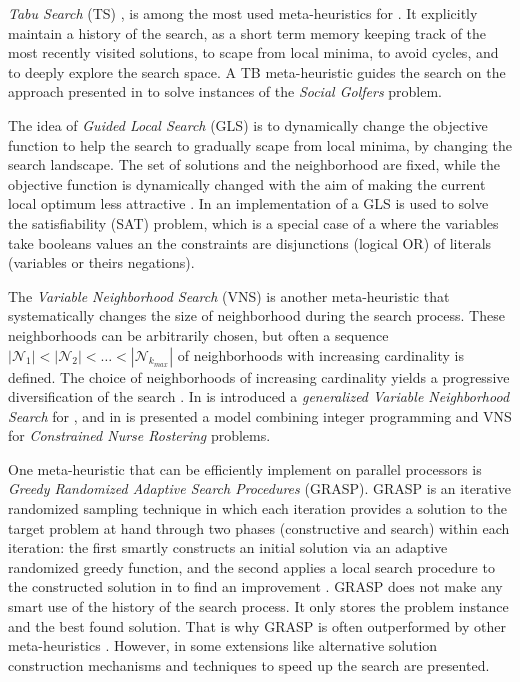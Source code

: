 {\it Tabu Search} (TS) \cite{Gendreau2010}, is among the most used meta-heuristics for \COPs. It explicitly maintain a history of the search, as a short term memory keeping track of the most recently visited solutions, to scape from local minima, to avoid cycles, and to deeply explore the search space. A TB meta-heuristic guides the search on the approach presented in \cite{IvanDotu2007} to solve instances of the \textit{Social Golfers} problem.

The idea of {\it Guided Local Search} (GLS) \cite{Christos2010} is to dynamically change the objective function to help the search to gradually scape from local minima, by changing the search landscape. The set of solutions and the neighborhood are fixed, while the objective function is dynamically changed with the aim of making the current local optimum less attractive \cite{Blum2003}. In \cite{Mills2000} an implementation of a GLS is used to solve the satisfiability (SAT) problem, which is a special case of a \csp{} where the variables take booleans values an the constraints are disjunctions (logical OR) of literals (variables or theirs negations).

The \textit{Variable Neighborhood Search} (VNS) is another meta-heuristic that systematically changes the size of neighborhood during the search process. These neighborhoods can be arbitrarily chosen, but often a sequence $\left|\mathcal{N}_1\right|<\left|\mathcal{N}_2\right|< \dots<\left|\mathcal{N}_{k_{max}}\right|$ of neighborhoods with increasing cardinality is defined. The choice of neighborhoods of increasing cardinality yields a progressive diversification of the search \cite{PierreNenad,Blum2003}. In \cite{Bouhmala2015} is introduced a \textit{generalized Variable Neighborhood Search} for \COPs, and in \cite{Burke2010} is presented a model combining integer programming and VNS for \textit{Constrained Nurse Rostering} problems.

One meta-heuristic that can be efficiently implement on parallel processors is {\it Greedy Randomized Adaptive Search Procedures} (GRASP). GRASP is an iterative randomized sampling technique in which each iteration provides a solution to the target problem at hand through two phases (constructive and search) within each iteration: the first smartly constructs an initial solution via an adaptive randomized greedy function, and the second applies a local search procedure to the constructed solution in to find an improvement \cite{Feo95}. GRASP does not make any smart use of the history of the search process. It only stores the problem instance and the best found solution. That is why GRASP is often outperformed by other meta-heuristics \cite{Blum2003}. However, in \cite{Resende2009} some extensions like alternative solution construction mechanisms and techniques to speed up the search are presented.

